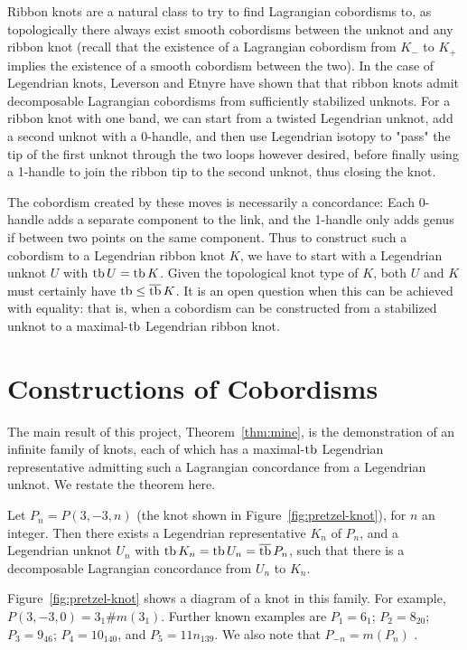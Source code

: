 Ribbon knots are a natural class to try to find Lagrangian cobordisms to, as topologically there always exist smooth cobordisms between the unknot and any ribbon knot (recall that the existence of  a Lagrangian cobordism from $K_-$ to $K_+$ implies the existence of a smooth cobordism between the two).
In the case of Legendrian knots, Leverson and Etnyre have shown \cite{leverson-etnyre} that that ribbon knots admit decomposable Lagrangian cobordisms from sufficiently stabilized unknots.
For a ribbon knot with one band, we can start from a twisted Legendrian unknot, add a second unknot with a 0-handle, and then use Legendrian isotopy to "pass" the tip of the first unknot through the two loops however desired, before finally using a 1-handle to join the ribbon tip to the second unknot, thus closing the knot. 

The cobordism created by these moves is necessarily a concordance: Each 0-handle adds a separate component to the link, and the 1-handle only adds genus if between two points on the same component.
Thus to construct such a cobordism to a Legendrian ribbon knot $K$, we have to start with a Legendrian unknot $U$ with $\operatorname{tb} U = \operatorname{tb} K$. Given the topological knot type of $K$, both $U$ and $K$ must certainly have $\operatorname{tb} \leq \overline{\operatorname{tb}}\, K$.
It is an open question when this can be achieved with equality: that is, when a cobordism can be constructed from a stabilized unknot to a maximal-$\operatorname{tb}$ Legendrian ribbon knot.

\section{Constructions of Cobordisms}\label{sec:thm-a-proof}
The main result of this project, Theorem~\ref{thm:mine}, is the demonstration of an infinite family of knots, each of which has a maximal-$\operatorname{tb}$ Legendrian representative admitting such a Lagrangian concordance from a Legendrian unknot. We restate the theorem here.

\begin{mythm}\label{thm:mine}
    Let $P_n = P(3, -3, n)$ (the knot shown in Figure~\ref{fig:pretzel-knot}), for $n$ an integer. Then there exists a Legendrian representative $K_n$ of $P_n$, and a Legendrian unknot $U_n$ with ${\operatorname{tb} K_n = \operatorname{tb} U_n = \overline{\operatorname{tb}}\, P_n}$, such that there is a decomposable Lagrangian concordance from $U_n$ to $K_n$.
\end{mythm}

Figure~\ref{fig:pretzel-knot} shows a diagram of a knot in this family.
For example, $P(3, -3, 0) = 3_1 \# m(3_1)$. Further known examples are $P_1 = 6_1$; $P_2 = 8_{20}$; $P_3 = 9_{46}$; $P_4 = 10_{140}$, and $P_5 = 11n_{139}$. We also note that $P_{-n} = m(P_n)$ \cite{kawauchi}.

